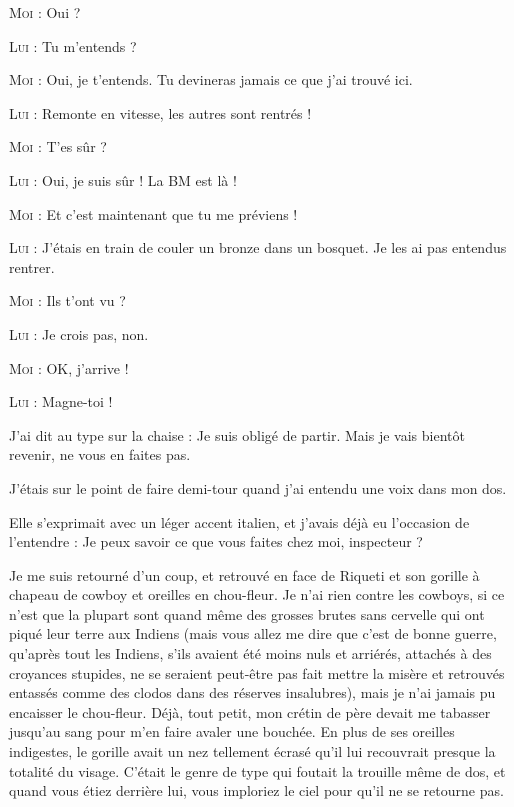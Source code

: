 \begin{dialogue}

\textsc{Moi} : Oui ?

\textsc{Lui} : Tu m’entends ?

\textsc{Moi} : Oui, je t’entends. Tu devineras jamais ce que j’ai trouvé ici.

\textsc{Lui} : Remonte en vitesse, les autres sont rentrés !

\textsc{Moi} : T’es sûr ?

\textsc{Lui} : Oui, je suis sûr ! La BM est là !

\textsc{Moi} : Et c’est maintenant que tu me préviens !

\textsc{Lui} : J’étais en train de couler un bronze dans un bosquet. Je les ai pas entendus rentrer.

\textsc{Moi} : Ils t’ont vu ?

\textsc{Lui} : Je crois pas, non.

\textsc{Moi} : OK, j’arrive !

\textsc{Lui} : Magne-toi !

J’ai dit au type sur la chaise : Je suis obligé de partir. Mais je vais bientôt revenir, ne vous en faites pas.

\end{dialogue}

J’étais sur le point de faire demi-tour quand j’ai entendu une voix dans mon dos.

Elle s’exprimait avec un léger accent italien, et j’avais déjà eu l’occasion de l’entendre : Je peux savoir ce que vous faites chez moi, inspecteur ?

Je me suis retourné d’un coup, et retrouvé en face de Riqueti et son gorille à chapeau de cowboy et oreilles en chou-fleur. Je n’ai rien contre les cowboys, si ce n’est que la plupart sont quand même des grosses brutes sans cervelle qui ont piqué leur terre aux Indiens (mais vous allez me dire que c’est de bonne guerre, qu’après tout les Indiens, s’ils avaient été moins nuls et arriérés, attachés à des croyances stupides, ne se seraient peut-être pas fait mettre la misère et retrouvés entassés comme des clodos dans des réserves insalubres), mais je n’ai jamais pu encaisser le chou-fleur. Déjà, tout petit, mon crétin de père devait me tabasser jusqu’au sang pour m’en faire avaler une bouchée. En plus de ses oreilles indigestes, le gorille avait un nez tellement écrasé qu’il lui recouvrait presque la totalité du visage. C’était le genre de type qui foutait la trouille même de dos, et quand vous étiez derrière lui, vous imploriez le ciel pour qu’il ne se retourne pas.

